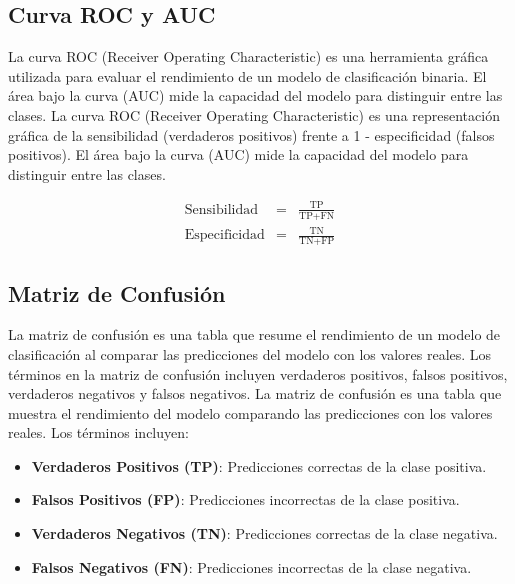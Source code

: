\documentclass[a4paper]{report} %
\begin{document}
\subsection{Curva ROC y AUC}
La curva ROC (Receiver Operating Characteristic) es una herramienta gr\'afica utilizada para evaluar el rendimiento de un modelo de clasificaci\'on binaria. El \'area bajo la curva (AUC) mide la capacidad del modelo para distinguir entre las clases. 
La curva ROC (Receiver Operating Characteristic) es una representaci\'on gr\'afica de la sensibilidad (verdaderos positivos) frente a 1 - especificidad (falsos positivos). El \'area bajo la curva (AUC) mide la capacidad del modelo para distinguir entre las clases.

\begin{eqnarray*}
\text{Sensibilidad} &=& \frac{\text{TP}}{\text{TP} + \text{FN}} \\
\text{Especificidad} &=& \frac{\text{TN}}{\text{TN} + \text{FP}}
\end{eqnarray*}



\subsection{Matriz de Confusi\'on}
La matriz de confusi\'on es una tabla que resume el rendimiento de un modelo de clasificaci\'on al comparar las predicciones del modelo con los valores reales. Los t\'erminos en la matriz de confusi\'on incluyen verdaderos positivos, falsos positivos, verdaderos negativos y falsos negativos. 
La matriz de confusi\'on es una tabla que muestra el rendimiento del modelo comparando las predicciones con los valores reales. Los t\'erminos incluyen:
\begin{itemize}
    \item \textbf{Verdaderos Positivos (TP)}: Predicciones correctas de la clase positiva.
    \item \textbf{Falsos Positivos (FP)}: Predicciones incorrectas de la clase positiva.
    \item \textbf{Verdaderos Negativos (TN)}: Predicciones correctas de la clase negativa.
    \item \textbf{Falsos Negativos (FN)}: Predicciones incorrectas de la clase negativa.
\end{itemize}
\end{document}
